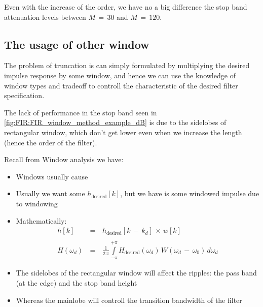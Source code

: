 \documentclass[12pt,a4paper]{book}
\begin{document}
Even with the increase of the order, we have no a big difference the stop band attenuation levels between $M \, = \,30$ and $M \, = \, 120$.\\

\subsection{The usage of other window}

The problem of truncation is can simply formulated by multiplying the desired impulse response by some window, and hence we can use the knowledge of window types and tradeoff to controll the characteristic of the desired filter specification.

The lack of performance in the stop band seen in \autoref{fig:FIR:FIR_window_method_example_dB} is due to the sidelobes of rectangular window, which don't get lower even when we increase the length (hence the order of the filter).

Recall from Window analysis we have:

\begin{itemize}
    
\item Windows usually cause 

\item Usually we want some $h_{\text{desired}}[k]$, but we have is some windowed impulse due to windowing

\item Mathematically:
\begin{equation}
\begin{array}{rcl}
     h[k] \, &=& \, h_{\text{desired}}[k \, - \, k_d] \, \times \, w[k]  \\ \\
     H(\omega_d) \, &=& \, \displaystyle\frac{1}{2 \, \pi} \displaystyle\int\limits_{- \pi}^{+\pi} H_{\text{desired}}(\omega_d) \, W(\omega_d \, - \, \omega_0) \, d\omega_d
\end{array}    
\end{equation}

\item The sidelobes of the rectangular window will affect the ripples: the pass band (at the edge) and the stop band height

\item Whereas the mainlobe will controll the transition bandwidth of the filter

\end{itemize}
\end{document}
